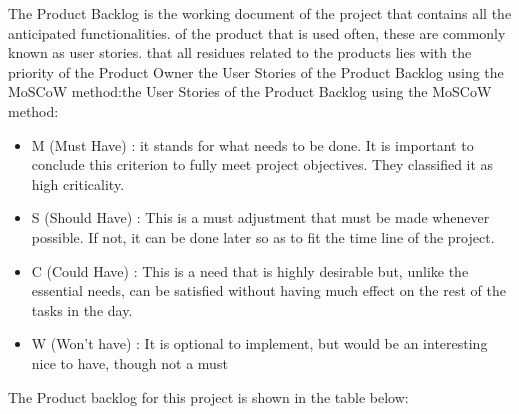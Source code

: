 The Product Backlog is the working document of the project that contains all the anticipated functionalities.
of the product that is used often, these are commonly known as user stories.
that all residues related to the products lies with the priority of the Product Owner
the User Stories of the Product Backlog using the MoSCoW method:the User Stories of the Product Backlog using the MoSCoW method:
\begin{itemize}
    \item M (Must Have) : it stands for what needs to be done. It is important to conclude this criterion to fully meet project objectives. They classified it as high criticality.
    \item S (Should Have) : This is a must adjustment that must be made whenever possible. If not, it can be done later so as to fit the time line of the project.
    \item C (Could Have) : This is a need that is highly desirable but, unlike the essential needs, can be satisfied without having much effect on the rest of the tasks in the day.
    \item W (Won’t have) : It is optional to implement, but would be an interesting nice to have, though not a must
\end{itemize}
The Product backlog for this project is shown in the table below:

